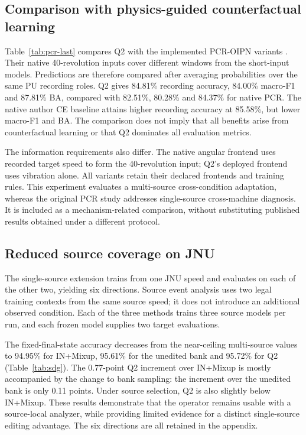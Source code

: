 \documentclass[a4paper,fleqn]{cas-sc}
\begin{document}
\subsection{Comparison with physics-guided counterfactual learning}

Table~\ref{tab:pcr-last} compares Q2 with the implemented PCR-OIPN variants \cite{pcr2026}. Their native 40-revolution inputs cover different windows from the short-input models. Predictions are therefore compared after averaging probabilities over the same PU recording roles. Q2 gives 84.81\% recording accuracy, 84.00\% macro-F1 and 87.81\% BA, compared with 82.51\%, 80.28\% and 84.37\% for native PCR. The native author CE baseline attains higher recording accuracy at 85.58\%, but lower macro-F1 and BA. The comparison does not imply that all benefits arise from counterfactual learning or that Q2 dominates all evaluation metrics.

The information requirements also differ. The native angular frontend uses recorded target speed to form the 40-revolution input; Q2's deployed frontend uses vibration alone. All variants retain their declared frontends and training rules. This experiment evaluates a multi-source cross-condition adaptation, whereas the original PCR study addresses single-source cross-machine diagnosis. It is included as a mechanism-related comparison, without substituting published results obtained under a different protocol.

\subsection{Reduced source coverage on JNU}

The single-source extension trains from one JNU speed and evaluates on each of the other two, yielding six directions. Source event analysis uses two legal training contexts from the same source speed; it does not introduce an additional observed condition. Each of the three methods trains three source models per run, and each frozen model supplies two target evaluations.

The fixed-final-state accuracy decreases from the near-ceiling multi-source values to 94.95\% for IN+Mixup, 95.61\% for the unedited bank and 95.72\% for Q2 (Table~\ref{tab:sdg}). The 0.77-point Q2 increment over IN+Mixup is mostly accompanied by the change to bank sampling: the increment over the unedited bank is only 0.11 points. Under source selection, Q2 is also slightly below IN+Mixup. These results demonstrate that the operator remains usable with a source-local analyzer, while providing limited evidence for a distinct single-source editing advantage. The six directions are all retained in the appendix.
\end{document}
